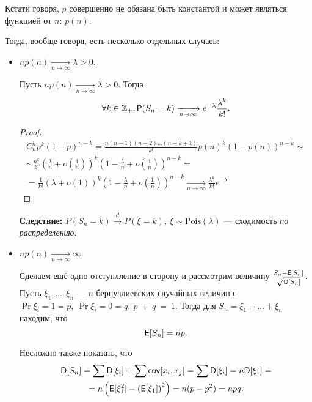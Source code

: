 Кстати говоря, $p$ совершенно не обязана быть константой и может являться функцией от $n$: $p(n)$.

Тогда, вообще говоря, есть несколько отдельных случаев:

\begin{itemize}
    \item
        $np(n) \xrightarrow[n\to\infty]{} \lambda > 0$.

        \begin{theorem}[Пуассон]

            Пусть $np(n) \xrightarrow[n\to\infty]{} \lambda > 0$.
            Тогда
                \[
                    \forall k \in \Z_+, \Pr(S_n = k) \xrightarrow[n\to\infty]{} e^{-\lambda}\frac{\lambda^k}{k!}.
                \]
        \end{theorem}
        \begin{proof}
            \begin{multline*}
                C_n^kp^k(1-p)^{n-k} =
                \frac{n(n-1)(n-2)\ldots(n-k+1)}{k!}p(n)^k(1-p(n))^{n-k} \sim\\\sim
                \frac{n^k}{k!}\left(\frac{\lambda}{n}+o\left(\frac{1}{n}\right)\right)^k\left( 1-\frac{\lambda}{n}+o\left( \frac{1}{n} \right) \right)^{n-k} =\\=
                \frac{1}{k!}\left(\lambda+o\left(1\right)\right)^k\left( 1-\frac{\lambda}{n}+o\left( \frac{1}{n} \right) \right)^{n-k} \xrightarrow[n\to\infty]{}
                \frac{\lambda^k}{k!}e^{-\lambda}
            \end{multline*}
        \end{proof}
        \textbf{Следствие:} $P(S_n = k) \overset{d}{\to} P(\xi = k),\ \xi \sim \mathrm{Pois}(\lambda)$ --- сходимость \emph{по распределению}.

    \item
        $np(n) \xrightarrow[n\to\infty]{} \infty$.

        Сделаем ещё одно отступлление в сторону и рассмотрим величину $\frac{S_n - \E[S_n]}{\sqrt{\D[S_n]}}$.
        Пусть \(\xi_1, \ldots, \xi_n \) --- $ n $ бернуллиевских случайных величин с \(\Pr{\xi_i = 1} = p,\ \Pr{\xi_i = 0} = q,\ p~+~q~=~1. \) Тогда для \(S_n = \xi_1 + \ldots + \xi_n \) 
        находим, что
        \[
            \E[S_n] = np.
        \]

        Несложно также показать, что
        \begin{multline*}
            \D[S_n] = \sum\D[\xi_i] + \sum\cov[x_i, x_j] = \sum\D[\xi_i] = n\D[\xi_1] =\\= n\left( \E[\xi_1^2]-\left( \E[\xi_1] \right)^2 \right) = n(p - p^2) = npq.
        \end{multline*}


\end{itemize}
